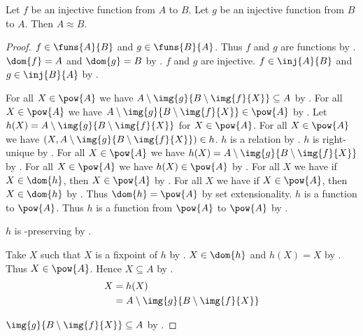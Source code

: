 \begin{theorem}\label{cantorschroederbernstein}
    Let $f$ be an injective function from $A$ to $B$.
    Let $g$ be an injective function from $B$ to $A$.
    Then $A\approx B$.
\end{theorem}
\begin{proof}
    $f\in\funs{A}{B}$ and $g\in\funs{B}{A}$.
    Thus $f$ and $g$ are functions by .
    $\dom{f}=A$ and $\dom{g}=B$ by .
    $f$ and $g$ are injective.
    $f\in\inj{A}{B}$ and $g\in\inj{B}{A}$
        by .

    For all $X\in\pow{A}$ we have
        $A\setminus \img{g}{B\setminus\img{f}{X}}\subseteq A$
        by .
    For all $X\in\pow{A}$ we have
        $A\setminus \img{g}{B\setminus\img{f}{X}}\in\pow{A}$
        by .
    Let $h(X) = A\setminus \img{g}{B\setminus\img{f}{X}}$ for $X\in\pow{A}$.
    For all $X\in\pow{A}$ we have
        $(X,A\setminus \img{g}{B\setminus\img{f}{X}})\in h$.
    $h$ is a relation by .
    $h$ is right-unique by .
    For all $X\in\pow{A}$ we have
        $h(X) = A\setminus \img{g}{B\setminus\img{f}{X}}$
        by .
    For all $X\in\pow{A}$ we have $h(X)\in\pow{A}$ by \auto.
    For all $X$ we have if $X\in\dom{h}$, then $X\in\pow{A}$
        by .
    For all $X$ we have if $X\in\pow{A}$, then $X\in\dom{h}$
        by .
    Thus $\dom{h} = \pow{A}$ by set extensionality.
    $h$ is a function to $\pow{A}$.
    Thus $h$ is a function from $\pow{A}$ to $\pow{A}$ by .

    $h$ is \subseteq-preserving by . %

    Take $X$ such that $X$ is a fixpoint of $h$ by .
    $X\in\dom{h}$ and $h(X)=X$ by .
    Thus $X\in\pow{A}$.
    Hence $X\subseteq A$ by .
    \begin{align*}
        X
            &= h(X)
            \\
            &= A\setminus \img{g}{B\setminus\img{f}{X}}
    \end{align*}

    $\img{g}{B\setminus\img{f}{X}}\subseteq A$
        by .


\end{proof}
